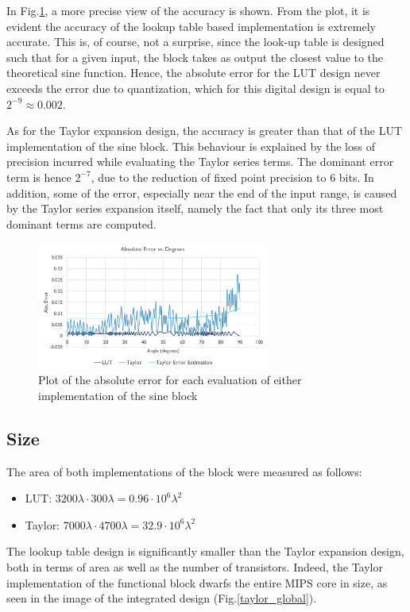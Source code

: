 \documentclass[10pt,journal]{IEEEtran}
\begin{document}
In Fig.\ref{errors}, a more precise view of the accuracy is shown. From the plot, it is evident the accuracy of the lookup table based implementation is extremely accurate. This is, of course, not a surprise, since the look-up table is designed such that for a given input, the block takes as output the closest value to the theoretical sine function. Hence, the absolute error for the LUT design never exceeds the error due to quantization, which for this digital design is equal to $2^{-9} \approx 0.002$.

As for the Taylor expansion design, the accuracy is greater than that of the LUT implementation of the sine block. This behaviour is explained by the loss of precision incurred while evaluating the Taylor series terms. The dominant error term is hence $2^{-7}$, due to the reduction of fixed point precision to 6 bits. In addition, some of the error, especially near the end of the input range, is caused by the Taylor series expansion itself, namely the fact that only its three most dominant terms are computed.

\begin{figure}[h]
\centering
\includegraphics[width=3in]{errors.png}
\caption{Plot of the absolute error for each evaluation of either implementation of the sine block}
\label{errors}
\end{figure}

\subsection{Size}
The area of both implementations of the block were measured as follows:
\begin{itemize}
	\item LUT: $3200 \lambda \cdot 300 \lambda = 0.96 \cdot 10^6 \lambda^2$
	\item Taylor: $7000 \lambda \cdot 4700\lambda = 32.9 \cdot 10^6 \lambda^2$ %
\end{itemize}
The lookup table design is significantly smaller than the Taylor expansion design, both in terms of area as well as the number of transistors. Indeed, the Taylor implementation of the functional block dwarfs the entire MIPS core in size, as seen in the image of the integrated design (Fig.\ref{taylor_global}).
\end{document}
